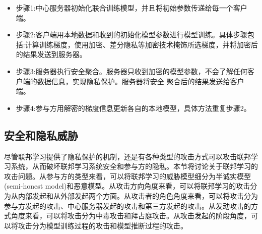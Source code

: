 \begin{itemize}
\item 步骤1:中心服务器初始化联合训练模型，并且将初始参数传递给每一个客户端。
\item 步骤2:客户端用本地数据和收到的初始化模型参数进行模型训练。具体步骤包括:计算训练梯度，使用加密、差分隐私等加密技术掩饰所选梯度，并将加密后的结果发送到服务器。
\item 步骤3:服务器执行安全聚合。服务器只收到加密的模型参数，不会了解任何客户端的数据信息，实现隐私保护。服务器将安全 聚合后的结果发送给客户端。
\item 步骤4:参与方用解密的梯度信息更新各自的本地模型，具体方法重复步骤2。
\end{itemize}

\subsection{安全和隐私威胁}
尽管联邦学习提供了隐私保护的机制，还是有各种类型的攻击方式可以攻击联邦学习系统，从而破坏联邦学习系统安全和参与方的隐私。本节将讨论关于联邦学习的攻击问题。从参与方的类型来看，可以将联邦学习的威胁模型细分为半诚实模型 (semi-honest model)和恶意模型。从攻击方向角度来看，可以将联邦学习的攻击分为从内部发起和从外部发起两个方面。从攻击者的角色角度来看，可以将攻击分为参与方发起的攻击、中心服务器发起的攻击和第三方发起的攻击。从发动攻击的方式角度来看，可以将攻击分为中毒攻击和拜占庭攻击。从攻击发起的阶段角度，可以将攻击分为模型训练过程的攻击和模型推断过程的攻击。

